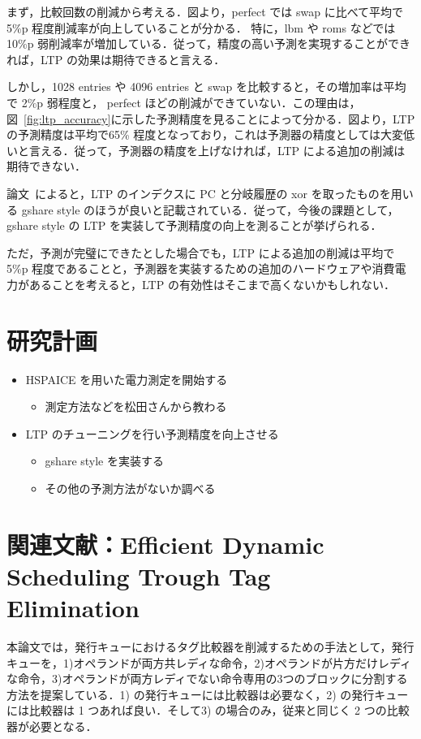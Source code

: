 \documentclass[twocolumn]{jsarticle}
\begin{document}
  まず，比較回数の削減から考える．図より，perfect では swap に比べて平均で 5\%p 程度削減率が向上していることが分かる． 特に，lbm や roms などでは 10\%p 弱削減率が増加している．従って，精度の高い予測を実現することができれば，LTP の効果は期待できると言える．

  しかし，1028 entries や 4096 entries と swap を比較すると，その増加率は平均で 2\%p 弱程度と， perfect ほどの削減ができていない．この理由は，図~\ref{fig:ltp_accuracy}に示した予測精度を見ることによって分かる．図より，LTP の予測精度は平均で65\% 程度となっており，これは予測器の精度としては大変低いと言える．従って，予測器の精度を上げなければ，LTP による追加の削減は期待できない．

  論文~\cite{ernst2002}によると，LTP のインデクスに PC と分岐履歴の xor を取ったものを用いる gshare style のほうが良いと記載されている．従って，今後の課題として，gshare style の LTP を実装して予測精度の向上を測ることが挙げられる．

  ただ，予測が完璧にできたとした場合でも，LTP による追加の削減は平均で 5\%p 程度であることと，予測器を実装するための追加のハードウェアや消費電力があることを考えると，LTP の有効性はそこまで高くないかもしれない．

  \section{研究計画}
  
  \begin{itemize}
    \item HSPAICE を用いた電力測定を開始する
    \begin{itemize}
      \item 測定方法などを松田さんから教わる
    \end{itemize}
    \item LTP のチューニングを行い予測精度を向上させる
    \begin{itemize}
      \item gshare style を実装する
      \item その他の予測方法がないか調べる
    \end{itemize}
  \end{itemize}
  
  \section{関連文献：Efficient Dynamic Scheduling Trough Tag Elimination~\cite{ernst2002}}
  本論文では，発行キューにおけるタグ比較器を削減するための手法として，発行キューを，1)オペランドが両方共レディな命令，2)オペランドが片方だけレディな命令，3)オペランドが両方レディでない命令専用の3つのブロックに分割する方法を提案している．1) の発行キューには比較器は必要なく，2) の発行キューには比較器は 1 つあれば良い．そして3) の場合のみ，従来と同じく 2 つの比較器が必要となる． 
  
\end{document}
